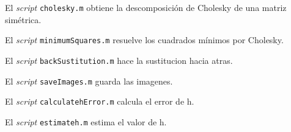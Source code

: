 \documentclass{article}
\begin{document}
\par El \textit{script} \verb+cholesky.m+ obtiene la descomposición de Cholesky de una matriz simétrica.

\begin{ttfamily}
\begin{center}
\end{center}
\end{ttfamily}

\par El \textit{script} \verb+minimumSquares.m+ resuelve los cuadrados mínimos por Cholesky.

\begin{ttfamily}
\begin{center}
\end{center}
\end{ttfamily}

\par El \textit{script} \verb+backSustitution.m+ hace la sustitucion hacia atras.

\begin{ttfamily}
\begin{center}
\end{center}
\end{ttfamily}


\par El \textit{script} \verb+saveImages.m+ guarda las imagenes.

\begin{ttfamily}
\begin{center}
\end{center}
\end{ttfamily}

\par El \textit{script} \verb+calculatehError.m+ calcula el error de h.

\begin{ttfamily}
\begin{center}
\end{center}
\end{ttfamily}


\par El \textit{script} \verb+estimateh.m+ estima el valor de h.

\begin{ttfamily}
\begin{center}
\end{center}
\end{ttfamily}
\end{document}
